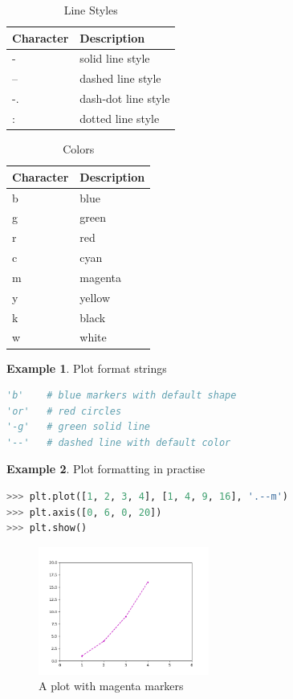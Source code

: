 \documentclass{article}
\theoremstyle{definition}
\newtheorem{ex}{Example}[subsection]
\theoremstyle{remark}
\begin{document}
\begin{table}[h!]
\centering
\begin{tabular}{ >{\centering}p{3cm} p{6cm}}
    \hline
    Character & Description \\
    \hline
    - 	& solid line style \\
    -- 	& dashed line style \\
    -. 	& dash-dot line style \\
    : 	& dotted line style \\
    \hline
\end{tabular}
\caption{Line Styles}
\label{table:line_styles}
\end{table}

\begin{table}[h!]
\centering
\begin{tabular}{ >{\centering}p{3cm} p{6cm}}
    \hline
    Character & Description \\
    \hline
    b 	& blue \\
    g 	& green \\
    r 	& red \\
    c 	& cyan \\
    m 	& magenta \\
    y 	& yellow \\
    k 	& black \\
    w 	& white \\
    \hline
\end{tabular}
\caption{Colors}
\label{table:colors}
\end{table}

\pagebreak

\begin{ex} Plot format strings
\begin{lstlisting}[language=Python]
'b'    # blue markers with default shape
'or'   # red circles
'-g'   # green solid line
'--'   # dashed line with default color
\end{lstlisting}
\end{ex}


\begin{ex} Plot formatting in practise
\begin{lstlisting}[language=Python]
>>> plt.plot([1, 2, 3, 4], [1, 4, 9, 16], '.--m')
>>> plt.axis([0, 6, 0, 20])
>>> plt.show()
\end{lstlisting}

\begin{figure}[h!]
    \centering
    \includegraphics[width=0.5\textwidth]{matplotlib_magenta_markers}
    \caption{A plot with magenta markers}
    \label{fig:mpl_magenta_markers}
\end{figure}
\end{ex}
\end{document}
